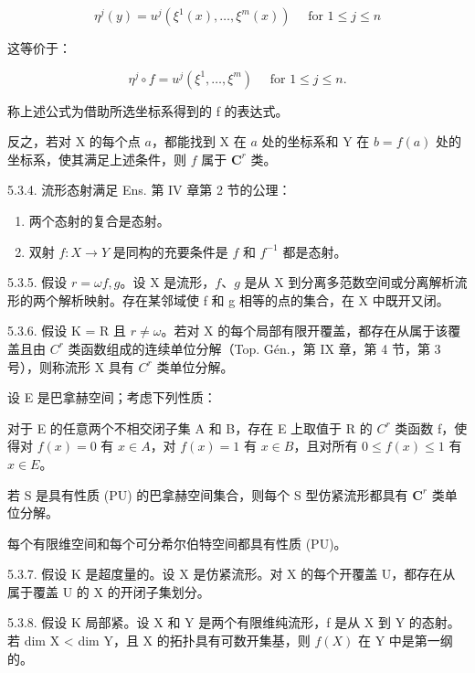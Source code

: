 \[
\eta^ {j} (y) = u ^ {j} (\xi^ {1} (x), \dots , \xi^ {m} (x)) \quad \text { for } 1 \leqslant j \leqslant n\tag{1}
\]

这等价于：

\[
\eta^ {j} \circ f = u ^ {j} (\xi^ {1}, \dots , \xi^ {m}) \quad \text { for } 1 \leqslant j \leqslant n.\tag{2}
\]

称上述公式为借助所选坐标系得到的 f 的表达式。

反之，若对 X 的每个点 \(a\)，都能找到 X 在 \(a\) 处的坐标系和 Y 在 \(b = f(a)\) 处的坐标系，使其满足上述条件，则 \(f\) 属于 \(\mathbf{C}^{r}\) 类。

5.3.4. 流形态射满足 Ens. 第 IV 章第 2 节的公理：

\begin{enumerate}
\def\labelenumi{\alph{enumi})}
\item
  两个态射的复合是态射。
\item
  双射 \(f:X\to Y\) 是同构的充要条件是 \(f\) 和 \(f^{-1}\) 都是态射。
\end{enumerate}

5.3.5. 假设 \(r = \omega\)\(f, g\)。设 X 是流形，\(f\)、\(g\) 是从 X 到分离多范数空间或分离解析流形的两个解析映射。存在某邻域使 f 和 g 相等的点的集合，在 X 中既开又闭。

5.3.6. 假设 K = R 且 \(r \neq \omega\)。若对 X 的每个局部有限开覆盖，都存在从属于该覆盖且由 \(C^{r}\) 类函数组成的连续单位分解（Top. Gén.，第 IX 章，第 4 节，第 3 号），则称流形 X 具有 \(C^{r}\) 类单位分解。

设 E 是巴拿赫空间；考虑下列性质：

对于 E 的任意两个不相交闭子集 A 和 B，存在 E 上取值于 R 的 \(C^{r}\) 类函数 f，使得对 \(f(x) = 0\) 有 \(x \in A\)，对 \(f(x) = 1\) 有 \(x \in B\)，且对所有 \(0 \leqslant f(x) \leqslant 1\) 有 \(x \in E\)。

若 S 是具有性质 (PU) 的巴拿赫空间集合，则每个 S 型仿紧流形都具有 \(\mathbf{C}^{r}\) 类单位分解。

每个有限维空间和每个可分希尔伯特空间都具有性质 (PU)。

5.3.7. 假设 K 是超度量的。设 X 是仿紧流形。对 X 的每个开覆盖 U，都存在从属于覆盖 U 的 X 的开闭子集划分。

5.3.8. 假设 K 局部紧。设 X 和 Y 是两个有限维纯流形，f 是从 X 到 Y 的态射。若 dim X \textless{} dim Y，且 X 的拓扑具有可数开集基，则 \(f(X)\) 在 Y 中是第一纲的。
